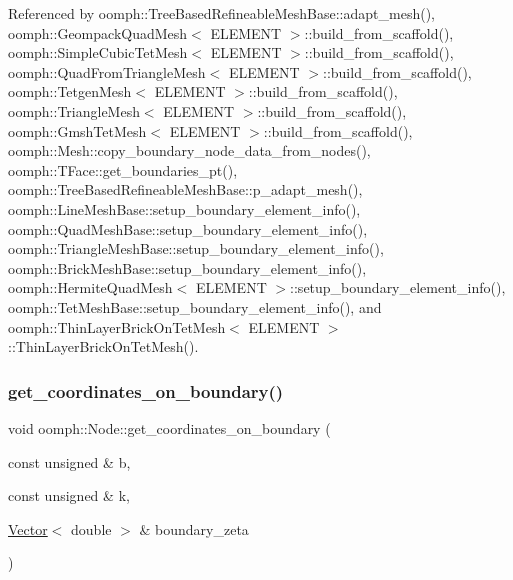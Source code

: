 Referenced by oomph\+::\+Tree\+Based\+Refineable\+Mesh\+Base\+::adapt\+\_\+mesh(), oomph\+::\+Geompack\+Quad\+Mesh$<$ E\+L\+E\+M\+E\+N\+T $>$\+::build\+\_\+from\+\_\+scaffold(), oomph\+::\+Simple\+Cubic\+Tet\+Mesh$<$ E\+L\+E\+M\+E\+N\+T $>$\+::build\+\_\+from\+\_\+scaffold(), oomph\+::\+Quad\+From\+Triangle\+Mesh$<$ E\+L\+E\+M\+E\+N\+T $>$\+::build\+\_\+from\+\_\+scaffold(), oomph\+::\+Tetgen\+Mesh$<$ E\+L\+E\+M\+E\+N\+T $>$\+::build\+\_\+from\+\_\+scaffold(), oomph\+::\+Triangle\+Mesh$<$ E\+L\+E\+M\+E\+N\+T $>$\+::build\+\_\+from\+\_\+scaffold(), oomph\+::\+Gmsh\+Tet\+Mesh$<$ E\+L\+E\+M\+E\+N\+T $>$\+::build\+\_\+from\+\_\+scaffold(), oomph\+::\+Mesh\+::copy\+\_\+boundary\+\_\+node\+\_\+data\+\_\+from\+\_\+nodes(), oomph\+::\+T\+Face\+::get\+\_\+boundaries\+\_\+pt(), oomph\+::\+Tree\+Based\+Refineable\+Mesh\+Base\+::p\+\_\+adapt\+\_\+mesh(), oomph\+::\+Line\+Mesh\+Base\+::setup\+\_\+boundary\+\_\+element\+\_\+info(), oomph\+::\+Quad\+Mesh\+Base\+::setup\+\_\+boundary\+\_\+element\+\_\+info(), oomph\+::\+Triangle\+Mesh\+Base\+::setup\+\_\+boundary\+\_\+element\+\_\+info(), oomph\+::\+Brick\+Mesh\+Base\+::setup\+\_\+boundary\+\_\+element\+\_\+info(), oomph\+::\+Hermite\+Quad\+Mesh$<$ E\+L\+E\+M\+E\+N\+T $>$\+::setup\+\_\+boundary\+\_\+element\+\_\+info(), oomph\+::\+Tet\+Mesh\+Base\+::setup\+\_\+boundary\+\_\+element\+\_\+info(), and oomph\+::\+Thin\+Layer\+Brick\+On\+Tet\+Mesh$<$ E\+L\+E\+M\+E\+N\+T $>$\+::\+Thin\+Layer\+Brick\+On\+Tet\+Mesh().

\mbox{\label{classoomph_1_1Node_abc8b7dc78cc1d0aab34eeaf856e21ea8}} 
\subsubsection{\texorpdfstring{get\+\_\+coordinates\+\_\+on\+\_\+boundary()}{get\_coordinates\_on\_boundary()}\hspace{0.1cm}{\footnotesize\ttfamily [1/2]}}
{\footnotesize\ttfamily void oomph\+::\+Node\+::get\+\_\+coordinates\+\_\+on\+\_\+boundary (\begin{DoxyParamCaption}\item[{const unsigned \&}]{b,  }\item[{const unsigned \&}]{k,  }\item[{\hyperlink{classoomph_1_1Vector}{Vector}$<$ double $>$ \&}]{boundary\+\_\+zeta }\end{DoxyParamCaption})\hspace{0.3cm}{\ttfamily [virtual]}}



